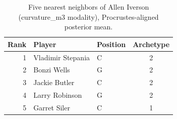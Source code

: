 \begin{table}[htbp]
  \centering\small
  \begin{tabular}{rllc}
    \toprule
    Rank & Player & Position & Archetype \\
    \midrule
    1 & Vladimir Stepania & C & 2 \\
    2 & Bonzi Wells & G & 2 \\
    3 & Jackie Butler & C & 2 \\
    4 & Larry Robinson & G & 2 \\
    5 & Garret Siler & C & 1 \\
    \bottomrule
  \end{tabular}
  \caption{Five nearest neighbors of Allen Iverson (curvature_m3 modality), Procrustes-aligned posterior mean.}
  \label{tab:Allen_Iverson_neighbors_curvature_m3}
\end{table}

